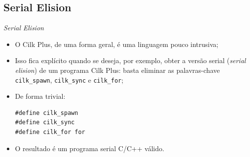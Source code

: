 \documentclass{beamer}
\begin{document}
\subsection{Serial Elision}
\begin{frame}[fragile]{\textit{Serial Elision}}
\begin{itemize}
    \item O Cilk Plus, de uma forma geral, é uma linguagem pouco intrusiva;
    \item Isso fica explícito quando se deseja, por exemplo, obter a versão
    serial (\textit{serial elision}) de um programa Cilk Plus: basta eliminar as
    palavras-chave \texttt{cilk\_spawn}, \texttt{cilk\_sync} e
    \texttt{cilk\_for};
\pause
    \item De forma trivial:
\begin{lstlisting}
#define cilk_spawn
#define cilk_sync
#define cilk_for for
\end{lstlisting}
    \item O resultado é um programa serial C/C++ válido.
\end{itemize}
\end{frame}
\end{document}
